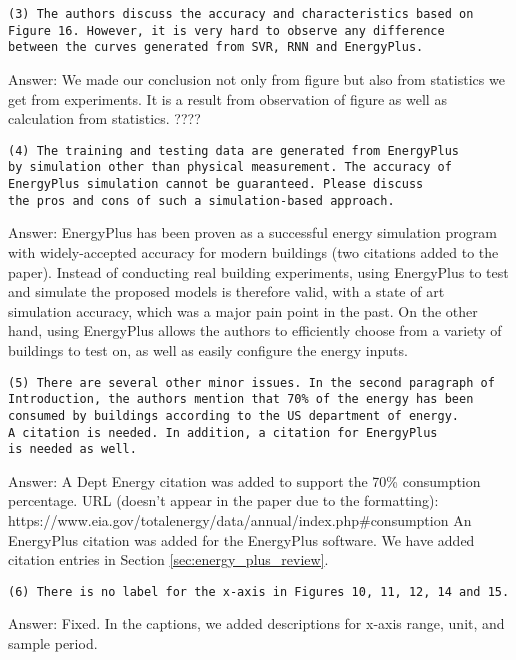 \begin{verbatim}
(3) The authors discuss the accuracy and characteristics based on
Figure 16. However, it is very hard to observe any difference
between the curves generated from SVR, RNN and EnergyPlus.
\end{verbatim}

Answer: We made our conclusion not only from figure but also from statistics we get
from experiments. It is a result from observation of figure as well as
calculation from statistics. ????

\begin{verbatim}
(4) The training and testing data are generated from EnergyPlus
by simulation other than physical measurement. The accuracy of
EnergyPlus simulation cannot be guaranteed. Please discuss
the pros and cons of such a simulation-based approach.
\end{verbatim}

Answer: EnergyPlus has been proven as a successful energy simulation program with
widely-accepted accuracy for modern buildings (two citations added to the
paper).  Instead of conducting real building experiments, using EnergyPlus to
test and simulate the proposed models is therefore valid, with a state of art
simulation accuracy, which was a major pain point in the past. On the other
hand, using EnergyPlus allows the authors to efficiently choose from a variety
of buildings to test on, as well as easily configure the energy inputs.

\begin{verbatim}
(5) There are several other minor issues. In the second paragraph of
Introduction, the authors mention that 70% of the energy has been
consumed by buildings according to the US department of energy.
A citation is needed. In addition, a citation for EnergyPlus
is needed as well.
\end{verbatim}

Answer: A Dept Energy citation was added to support the 70\% consumption
percentage.  URL (doesn't appear in the paper due to the formatting):
https://www.eia.gov/totalenergy/data/annual/index.php\#consumption An
EnergyPlus citation was added for the EnergyPlus software. We have added
citation entries in Section \ref{sec:energy_plus_review}.

\begin{verbatim}
(6) There is no label for the x-axis in Figures 10, 11, 12, 14 and 15.
\end{verbatim}

Answer: Fixed. In the captions, we added descriptions for x-axis range, unit, and
sample period.

